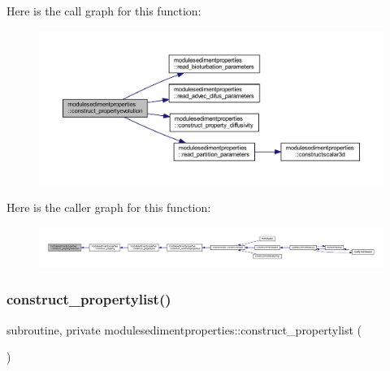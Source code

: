 Here is the call graph for this function\+:\nopagebreak
\begin{figure}[H]
\begin{center}
\leavevmode
\includegraphics[width=350pt]{namespacemodulesedimentproperties_a0062c792fb1ce4d0c7dbe3c701104971_cgraph}
\end{center}
\end{figure}
Here is the caller graph for this function\+:\nopagebreak
\begin{figure}[H]
\begin{center}
\leavevmode
\includegraphics[width=350pt]{namespacemodulesedimentproperties_a0062c792fb1ce4d0c7dbe3c701104971_icgraph}
\end{center}
\end{figure}
\mbox{\label{namespacemodulesedimentproperties_abc91092616fbf4edf02daa5a7b1fcbb9}} 
\subsubsection{\texorpdfstring{construct\+\_\+propertylist()}{construct\_propertylist()}}
{\footnotesize\ttfamily subroutine, private modulesedimentproperties\+::construct\+\_\+propertylist (\begin{DoxyParamCaption}{ }\end{DoxyParamCaption})\hspace{0.3cm}{\ttfamily [private]}}

